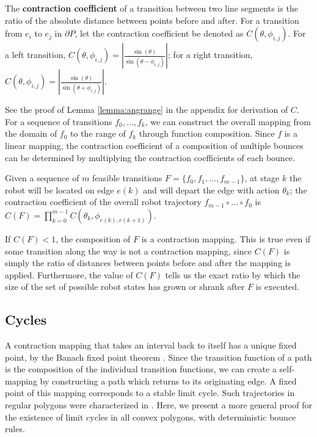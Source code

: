 \documentclass[]{styles/svproc}  %
\begin{document}
\begin{definition}
The \textbf{contraction coefficient} of a transition between two
line segments is the ratio of the absolute distance between points before and after.
For a transition from $e_i$ to $e_j$ in $\partial P$, let the contraction
coefficient be denoted as $C(\theta, \phi_{i, j})$. 
For a left transition, $C(\theta, \phi_{i, j}) = | \frac{\sin(\theta)}{\sin(\theta - \phi_{i, j})} |$; 
for a right transition,  $C(\theta, \phi_{i, j}) = | \frac{\sin(\theta)}{\sin(\theta + \phi_{i, j})} |$.
\end{definition}

See the proof of Lemma \ref{lemma:angrange} in the appendix for derivation of
$C$. For a sequence of transitions $f_0, \ldots, f_k$, we can construct the overall
mapping from the domain of $f_0$ to the range of $f_k$ through function
composition. Since $f$ is a linear mapping, the contraction coefficient of a composition 
of multiple bounces can be determined by multiplying the contraction
coefficients of each bounce.

\begin{definition} \label{def:c}
Given a sequence of $m$ feasible transitions $F = \{f_0, f_1, \ldots, f_{m-1}\}$, at stage $k$ the robot 
will be located on edge $e(k)$ and will depart the edge with
action $\theta_k$; the contraction coefficient of the overall robot
trajectory $f_{m-1} \circ \ldots \circ f_0$ is $C(F) = \prod_{k=0}^{m-1} C(\theta_{k}, \phi_{e(k), e(k+1)})$.
\end{definition}

If $C(F) < 1$, the composition of $F$ is a contraction mapping. This is true even if some transition along
the way is not a
contraction mapping, since $C(F)$ is simply the ratio of distances
between points before and after the mapping is applied. Furthermore, the value
of $C(F)$ tells us the exact ratio by which the
size of the set of possible robot states has grown or shrank after $F$ is
executed.

\subsection{Cycles} \label{sec:cycles}

A contraction mapping that takes an interval back
to itself has a unique fixed point, by the Banach fixed point
theorem \cite{Granas2003}. Since the transition function of a path is the
composition of the individual transition functions, we can create a self-mapping 
by constructing a path which returns to its originating edge. A fixed
point of this mapping corresponds to a stable limit cycle.
Such trajectories in regular polygons were characterized in \cite{NilBecLav17}.
Here, we present a more general proof for the existence of limit cycles in all
convex polygons, with deterministic bounce rules.
\end{document}
